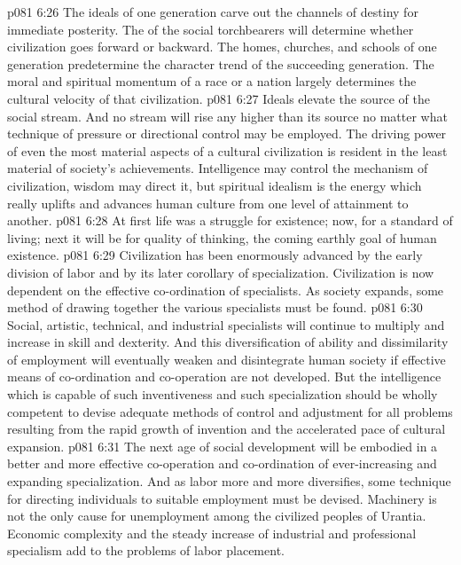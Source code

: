 \vs p081 6:26 \pc {}\bibnobreakspace {} The ideals of one generation carve out the channels of destiny for immediate posterity. The  of the social torchbearers will determine whether civilization goes forward or backward. The homes, churches, and schools of one generation predetermine the character trend of the succeeding generation. The moral and spiritual momentum of a race or a nation largely determines the cultural velocity of that civilization.
\vs p081 6:27 Ideals elevate the source of the social stream. And no stream will rise any higher than its source no matter what technique of pressure or directional control may be employed. The driving power of even the most material aspects of a cultural civilization is resident in the least material of society’s achievements. Intelligence may control the mechanism of civilization, wisdom may direct it, but spiritual idealism is the energy which really uplifts and advances human culture from one level of attainment to another.
\vs p081 6:28 At first life was a struggle for existence; now, for a standard of living; next it will be for quality of thinking, the coming earthly goal of human existence.
\vs p081 6:29 \pc {}\bibnobreakspace {} Civilization has been enormously advanced by the early division of labor and by its later corollary of specialization. Civilization is now dependent on the effective co\hyp{}ordination of specialists. As society expands, some method of drawing together the various specialists must be found.
\vs p081 6:30 Social, artistic, technical, and industrial specialists will continue to multiply and increase in skill and dexterity. And this diversification of ability and dissimilarity of employment will eventually weaken and disintegrate human society if effective means of co\hyp{}ordination and co\hyp{}operation are not developed. But the intelligence which is capable of such inventiveness and such specialization should be wholly competent to devise adequate methods of control and adjustment for all problems resulting from the rapid growth of invention and the accelerated pace of cultural expansion.
\vs p081 6:31 \pc {}\bibnobreakspace {} The next age of social development will be embodied in a better and more effective co\hyp{}operation and co\hyp{}ordination of ever\hyp{}increasing and expanding specialization. And as labor more and more diversifies, some technique for directing individuals to suitable employment must be devised. Machinery is not the only cause for unemployment among the civilized peoples of Urantia. Economic complexity and the steady increase of industrial and professional specialism add to the problems of labor placement.
